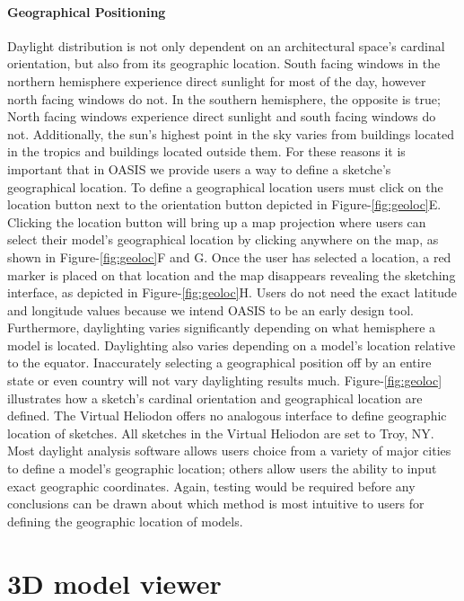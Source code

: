\paragraph{Geographical Positioning}
Daylight distribution is  not only dependent on an architectural space's cardinal orientation, but also from its geographic location.
South facing windows in the northern hemisphere experience direct sunlight for most of the day, however north facing windows do not.
In the southern hemisphere, the opposite is true; North facing windows experience direct sunlight and south facing windows do not.
Additionally, the sun's highest point in the sky varies from buildings located in the tropics and buildings located outside them.
For these reasons it is important that in OASIS we provide users a way to define a sketche's geographical location.
To define a geographical location users must click on the location button next to the orientation button depicted in Figure-\ref{fig:geoloc}E.
Clicking the location button will bring up a map projection where users can select their model's geographical location by clicking anywhere on the map, as shown in Figure-\ref{fig:geoloc}F and G.
Once the user has selected a location, a red marker is placed on that location and the map  disappears revealing the sketching interface, as depicted in Figure-\ref{fig:geoloc}H.
Users do not need the exact latitude and longitude values because we intend OASIS to be an early design tool. 
Furthermore, daylighting varies significantly depending on what hemisphere a model is located. Daylighting also varies depending on a model's location relative to the equator.
Inaccurately selecting a geographical position off by an entire state or even country will not vary daylighting results much.
Figure-\ref{fig:geoloc} illustrates how a sketch's cardinal orientation and geographical location are defined.
The Virtual Heliodon offers no analogous interface to define geographic location of sketches. 
All sketches in the Virtual Heliodon are set to Troy, NY.
Most daylight analysis software allows users choice from a variety of major cities to define a model's geographic location;
others allow users the ability to input exact geographic coordinates.
Again, testing would be required before any conclusions can be drawn about which method is most intuitive to users for defining the geographic location of models.

\section{3D model viewer}

